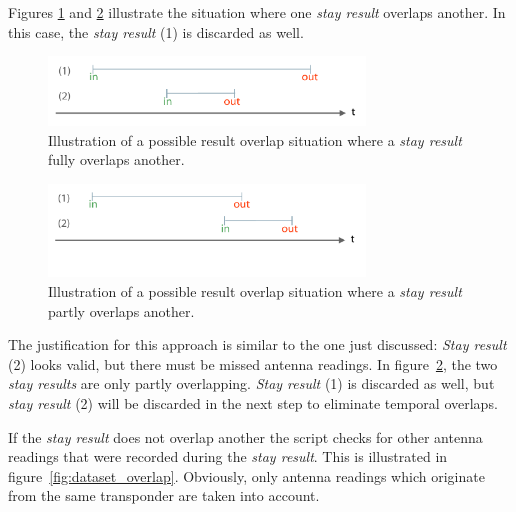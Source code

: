Figures \ref{fig:result_overlap_single} and \ref{fig:result_overlap_single_shifted} illustrate the situation where one \textit{stay result} overlaps another. In this case, the \textit{stay result} (1) is discarded as well.

\begin{figure}[htpb]
\begin{center}
  \includegraphics[width=0.75\textwidth]{assets/pdf/result_overlaps_single_schema.pdf}
  \caption[Single result full overlap situation]{Illustration of a possible result overlap situation where a \textit{stay result} fully overlaps another.}
  \label{fig:result_overlap_single}
\end{center}
\end{figure} 

\begin{figure}[htpb]
\begin{center}
  \includegraphics[width=0.75\textwidth]{assets/pdf/result_overlaps_single_shifted_schema.pdf}
  \caption[Single result partly overlapped]{Illustration of a possible result overlap situation where a \textit{stay result} partly overlaps another.}
  \label{fig:result_overlap_single_shifted}
\end{center}
\end{figure}

The justification for this approach is similar to the one just discussed: \textit{Stay result} (2) looks valid, but there must be missed antenna readings. In figure~\ref{fig:result_overlap_single_shifted}, the two \textit{stay results} are only partly overlapping. \textit{Stay result} (1) is discarded as well, but \textit{stay result} (2) will be discarded in the next step to eliminate temporal overlaps.


If the \textit{stay result} does not overlap another the script checks for other antenna readings that were recorded during the \textit{stay result}. This is illustrated in figure~\ref{fig:dataset_overlap}. Obviously, only antenna readings which originate from the same transponder are taken into account.

